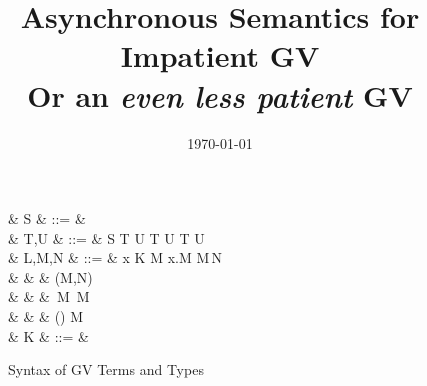 \documentclass[a4paper]{article}
\title{Asynchronous Semantics for Impatient GV \\ Or an \emph{even less patient} GV}
\date{\today}
\begin{document}
\maketitle

\begin{figure}[float]
\begin{syntax}
   & S & ::= &  \mid {} \mid {} \mid {} \\
   & T,U & ::= & S \mid \one \mid T \gvtimes U \mid \zero \mid T \gvplus U \mid T \lto U
  \\ %
   & L,M,N & ::= & x \mid K \app M \mid \lambda x.M \mid M\,N \\
  & & \mid & (M,N) \mid {} \\
  & & \mid & \,M \mid {}\,M \mid {} \\
  & & \mid & () \mid {} \mid {} \app M \\
   & K & ::= &  \mid {} \mid {} \mid {} \mid {}\\
\end{syntax}
\caption{Syntax of GV Terms and Types}\label{fig:gv-syntax}
\end{figure}
\end{document}
